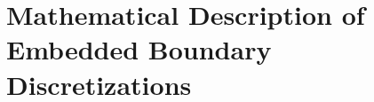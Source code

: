 \documentclass[12pt]{article}
\newcommand{\ind}{{\rm{ind}}}
\newcommand{\low}{{\rm{low}}}
\newcommand{\high}{{\rm{high}}}
\newcommand{\face}{{\mbf{f}}}
\begin{document}

\section{Mathematical Description of Embedded Boundary Discretizations}
\end{document}
